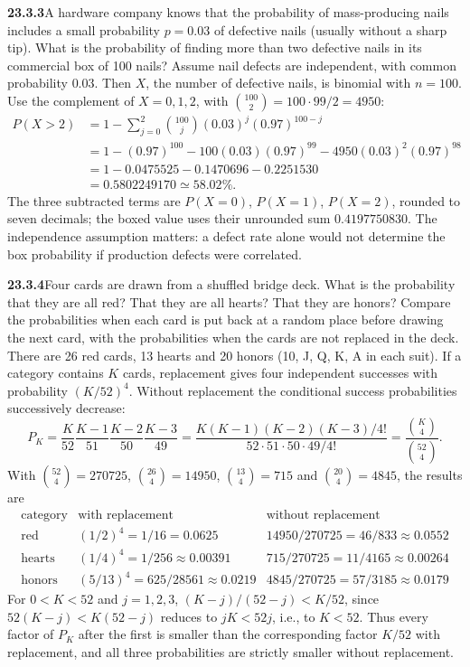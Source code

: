 \par\bigskip
\noindent\textbf{23.3.3}\quad A hardware company knows that the
probability of mass-producing nails includes a small probability
$p=0.03$ of defective nails (usually without a sharp tip). What
is the probability of finding more than two defective nails in
its commercial box of 100 nails?
\solution
Assume nail defects are independent, with common probability $0.03$.
Then $X$, the number of defective nails, is binomial with $n=100$.
Use the complement of $X=0,1,2$, with $\binom{100}2=100\cdot99/2=4950$:
\begin{align*}
P(X>2)&=1-\sum_{j=0}^2\binom{100}j(0.03)^j(0.97)^{100-j}\\
&=1-(0.97)^{100}-100(0.03)(0.97)^{99}
 -4950(0.03)^2(0.97)^{98}\\
&=1-0.0475525-0.1470696-0.2251530\\
&=\boxed{0.5802249170\simeq58.02\%}.
\end{align*}
The three subtracted terms are $P(X=0)$, $P(X=1)$, $P(X=2)$, rounded to
seven decimals; the boxed value uses their unrounded sum
$0.4197750830$.
The independence assumption matters: a defect rate alone would not
determine the box probability if production defects were correlated.


\par\bigskip
\noindent\textbf{23.3.4}\quad Four cards are drawn from a shuffled
bridge deck. What is the probability that they are all red? That
they are all hearts? That they are honors? Compare the
probabilities when each card is put back at a random place
before drawing the next card, with the probabilities when the
cards are not replaced in the deck.
\solution
There are 26 red cards, 13 hearts and 20 honors (10, J, Q, K, A in
each suit).
If a category contains $K$ cards, replacement gives four independent
successes with probability $(K/52)^4$. Without replacement the
conditional success probabilities successively decrease:
\[
P_K=\frac K{52}\frac{K-1}{51}\frac{K-2}{50}\frac{K-3}{49}
=\frac{K(K-1)(K-2)(K-3)/4!}{52\cdot51\cdot50\cdot49/4!}
=\frac{\binom K4}{\binom{52}4}.
\]
With $\binom{52}4=270725$, $\binom{26}4=14950$, $\binom{13}4=715$ and
$\binom{20}4=4845$, the results are
\[
\begin{array}{c|c|c}
\text{category}&\text{with replacement}&\text{without replacement}\\\hline
\text{red}&(1/2)^4=1/16=0.0625&14950/270725=46/833\approx0.0552\\
\text{hearts}&(1/4)^4=1/256\approx0.00391&715/270725=11/4165\approx0.00264\\
\text{honors}&(5/13)^4=625/28561\approx0.0219&4845/270725=57/3185\approx0.0179
\end{array}
\]
For $0<K<52$ and $j=1,2,3$, $(K-j)/(52-j)<K/52$,
since $52(K-j)<K(52-j)$ reduces to $jK<52j$, i.e., to $K<52$.
Thus every factor of $P_K$ after the first is smaller than the
corresponding factor $K/52$ with replacement, and all three
probabilities are strictly smaller without replacement.


